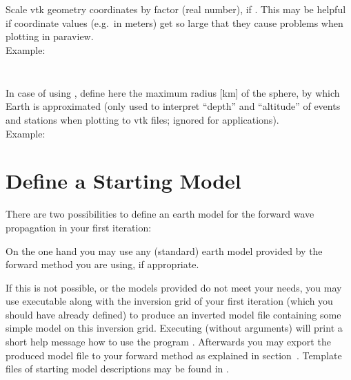 \subsubsection{}
Scale vtk geometry coordinates by factor  (real number), if 
. This may be helpful if coordinate values (e.g.\ in meters) 
get so large that they cause problems when plotting in paraview.\\
Example:\\
\\
\subsubsection{}
In case of using , define here the maximum radius [km] of the sphere, by which 
Earth is approximated (only used to interpret ``depth'' and ``altitude'' of events and stations when 
plotting to vtk files; ignored for  applications).\\
Example:\\
%
\section{Define a Starting Model} \label{basic_steps,sec:start_model}
%
There are two possibilities to define an earth model for the forward wave propagation in your first iteration:

On the one hand you may use any (standard) earth model provided by the forward method you are using, if appropriate.

If this is not possible, or the models provided do not meet your needs, you may use executable 
 along with the inversion grid of your first iteration (which you should 
have already defined) to produce an inverted model file containing some simple model on this inversion grid. 
Executing  (without arguments) will print a short help message how to use the program 
. Afterwards you may 
export the produced model file to your forward method as explained in section~.
Template files of starting model descriptions may be found in .
%
